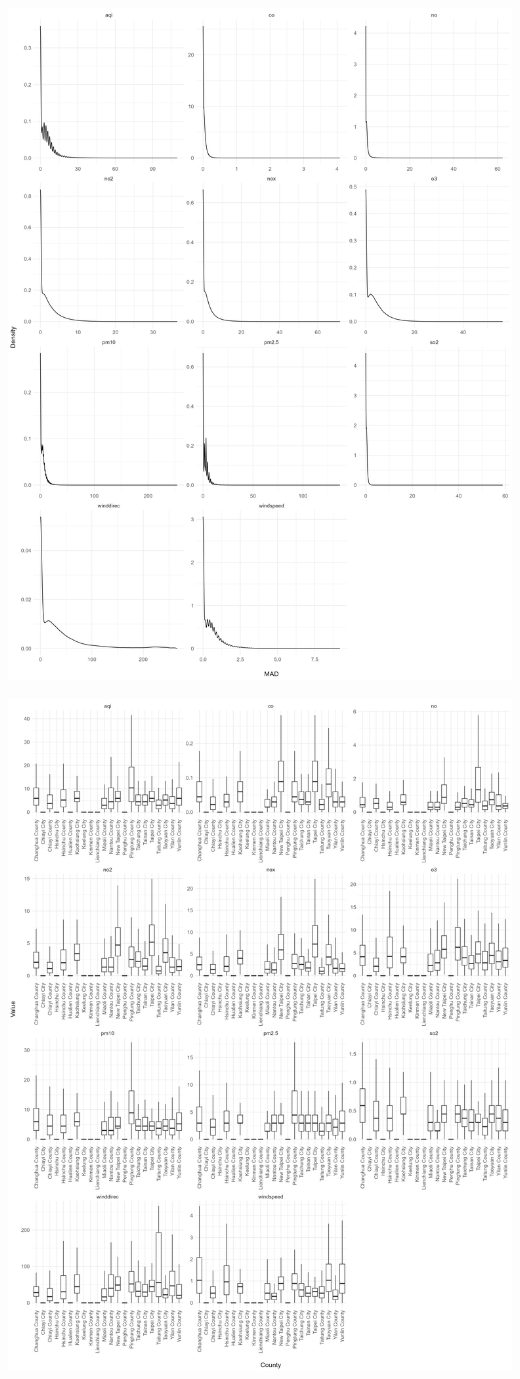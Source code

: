 \documentclass[./report.tex]{subfiles}
\begin{document}
\begin{enumerate}
  \includegraphics[width=\linewidth]{plots/question7/density.png}

  \includegraphics[width=\linewidth]{plots/question7/box-county.png}
\end{enumerate}
\end{document}
